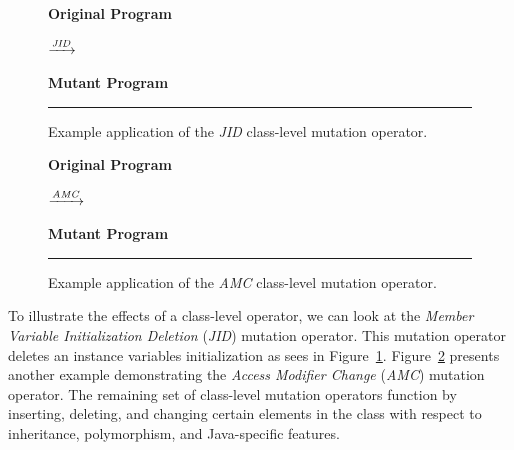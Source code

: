 \begin{figure}[!tb]
  \centering
  \begin{minipage}{6.5cm}
  \centering
  \footnotesize{\textbf{Original Program}}
  
  \end{minipage}
  $\xrightarrow{\emph{JID}}$
  \begin{minipage}{6.5cm}
  \centering
  \footnotesize{\textbf{Mutant Program}}
  
  \end{minipage}
  \caption{Example application of the \emph{JID} class-level mutation operator.}
  \vspace{2mm}
  \hrule
  \label{fig:JID_mutation}
\end{figure}

\begin{figure}[!tb]
  \centering
  \begin{minipage}{6.5cm}
  \centering
  \footnotesize{\textbf{Original Program}}
  
  \end{minipage}
  $\xrightarrow{\emph{AMC}}$
  \begin{minipage}{6.5cm}
  \centering
  \footnotesize{\textbf{Mutant Program}}
  
  \end{minipage}
  \caption{Example application of the \emph{AMC} class-level mutation operator.}
  \vspace{2mm}
  \hrule
  \label{fig:AMC_mutation}
\end{figure}

To illustrate the effects of a class-level operator, we can look at the \emph{Member Variable Initialization Deletion} (\emph{JID}) mutation operator. This mutation operator deletes an instance variables initialization as sees in Figure~\ref{fig:JID_mutation}. Figure~\ref{fig:AMC_mutation} presents another example demonstrating the \emph{Access Modifier Change} (\emph{AMC}) mutation operator. The remaining set of class-level mutation operators function by inserting, deleting, and changing certain elements in the class with respect to inheritance, polymorphism, and Java-specific features.


